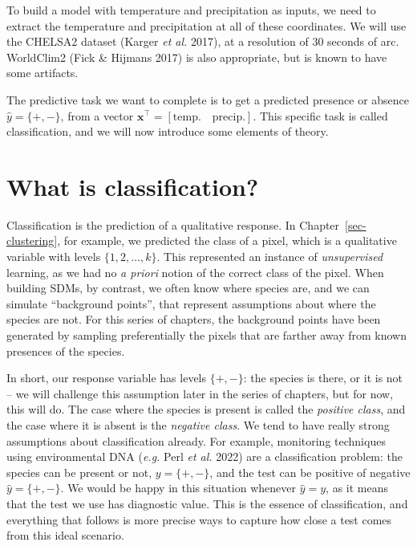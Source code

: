 \documentclass[
  letterpaper,
]{scrbook}
\begin{document}
To build a model with temperature and precipitation as inputs, we need
to extract the temperature and precipitation at all of these
coordinates. We will use the CHELSA2 dataset (Karger \emph{et al.}
2017), at a resolution of 30 seconds of arc. WorldClim2 (Fick \& Hijmans
2017) is also appropriate, but is known to have some artifacts.

The predictive task we want to complete is to get a predicted presence
or absence \(\hat y = \{+,-\}\), from a vector
\(\mathbf{x}^\top = [\text{temp.} \quad \text{precip.}]\). This specific
task is called classification, and we will now introduce some elements
of theory.

\section{What is classification?}\label{what-is-classification}

Classification is the prediction of a qualitative response. In
Chapter~\ref{sec-clustering}, for example, we predicted the class of a
pixel, which is a qualitative variable with levels
\(\{1, 2, \dots, k\}\). This represented an instance of
\emph{unsupervised} learning, as we had no \emph{a priori} notion of the
correct class of the pixel. When building SDMs, by contrast, we often
know where species are, and we can simulate ``background points'', that
represent assumptions about where the species are not. For this series
of chapters, the background points have been generated by sampling
preferentially the pixels that are farther away from known presences of
the species.


In short, our response variable has levels \(\{+, -\}\): the species is
there, or it is not -- we will challenge this assumption later in the
series of chapters, but for now, this will do. The case where the
species is present is called the \emph{positive class}, and the case
where it is absent is the \emph{negative class}. We tend to have really
strong assumptions about classification already. For example, monitoring
techniques using environmental DNA (\emph{e.g.} Perl \emph{et al.} 2022)
are a classification problem: the species can be present or not,
\(y = \{+,-\}\), and the test can be positive of negative
\(\hat y = \{+,-\}\). We would be happy in this situation whenever
\(\hat y = y\), as it means that the test we use has diagnostic value.
This is the essence of classification, and everything that follows is
more precise ways to capture how close a test comes from this ideal
scenario.
\end{document}
